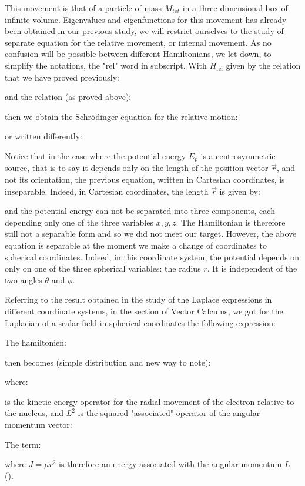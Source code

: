 	This movement is that of a particle of mass $M_{tot}$ in a three-dimensional box of infinite volume. Eigenvalues and eigenfunctions for this movement has already been obtained in our previous study, we will restrict ourselves to the study of separate equation for the relative movement, or internal movement. As no confusion will be possible between different Hamiltonians, we let down, to simplify the notations, the "rel" word in subscript.
	With $H_{\text{rel}}$ given by the relation that we have proved previously:
	
	and the relation (as proved above):
	
	then we obtain the Schrödinger equation for the relative motion:
	
	or written differently:
	
	Notice that in the case where the potential energy $E_{p}$ is a centrosymmetric source, that is to say it depends only on the length of the position vector $\vec{r}$, and not its orientation, the previous equation, written in Cartesian coordinates, is inseparable. Indeed, in Cartesian coordinates, the length $\vec{r}$ is given by:
	
	and the potential energy can not be separated into three components, each depending only one of the three variables $x, y, z$. The Hamiltonian is therefore still not a separable form and so we did not meet our target. However, the above equation is separable at the moment we make a change of coordinates to spherical coordinates. Indeed, in this coordinate system, the potential depends on only on one of the three spherical variables: the radius $r$. It is independent of the two angles $\theta$ and $\phi$.
	
	Referring to the result obtained in the study of the Laplace expressions in different coordinate systems, in the section of Vector Calculus, we got for the Laplacian of a scalar field in spherical coordinates the following expression:
	
	The hamiltonien:
	
	then becomes (simple distribution and new way to note):
	
	where:
	
	is the kinetic energy operator for the radial movement of the electron relative to the nucleus, and $L^2$ is the squared "associated" operator of the angular momentum vector:
	
	The term:
	
	where $J=\mu r^2$ is therefore an energy associated with the angular momentum $L$ ().
	
